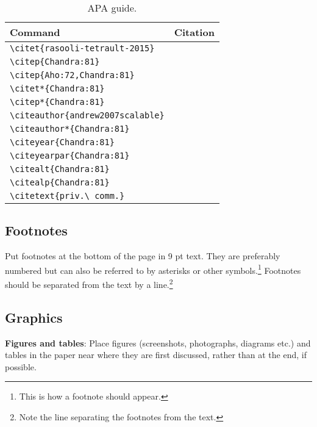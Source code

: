 \documentclass[a4paper,11pt]{article}
\begin{document}
\begin{table}[htb]
\begin{center}
\begin{tabular}{|l|l|}
\hline \bf Command & \bf Citation\\ \hline
\verb|\citet{rasooli-tetrault-2015}|	& \citet{rasooli-tetrault-2015}  \\
\verb|\citep{Chandra:81}|	& \citep{Chandra:81} \\
\verb|\citep{Aho:72,Chandra:81}| & \citep{Aho:72,Chandra:81} \\
\verb|\citet*{Chandra:81}|	& \citet*{Chandra:81} \\
\verb|\citep*{Chandra:81}| &  \citep*{Chandra:81} \\
\verb|\citeauthor{andrew2007scalable}|	& \citeauthor{andrew2007scalable} \\
\verb|\citeauthor*{Chandra:81}| & \citeauthor*{Chandra:81} \\
\verb|\citeyear{Chandra:81}|	&  \citeyear{Chandra:81}\\
\verb|\citeyearpar{Chandra:81}|	& \citeyearpar{Chandra:81} \\
\verb|\citealt{Chandra:81}|	&  \citealt{Chandra:81}\\
\verb|\citealp{Chandra:81}| 	& \citealp{Chandra:81}  \\
\verb|\citetext{priv.\ comm.}|	& \citetext{priv.\ comm.} \\
\hline
\end{tabular}
\end{center}
\caption{\label{apa-table} APA guide. }
\end{table}


\subsection{Footnotes}

Put footnotes at the bottom of the page in 9 pt
text. They are preferably numbered but can also be referred to by asterisks or other
symbols.\footnote{This is how a footnote should appear.} Footnotes
should be separated from the text by a line.\footnote{Note the line
separating the footnotes from the text.}

\subsection{Graphics}

{\bf Figures and tables}: Place figures (screenshots, photographs, diagrams etc.)
and tables in the paper near where they are first discussed,
rather than at the end, if possible.
\end{document}
